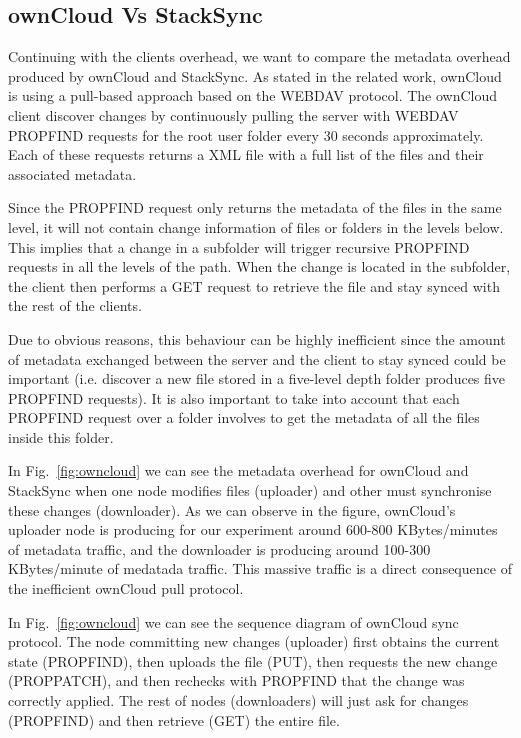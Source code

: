 \subsection{ownCloud Vs StackSync}

Continuing with the clients overhead, we want to compare the metadata overhead produced by ownCloud and StackSync. As stated in the related work, ownCloud is using a pull-based approach based on the WEBDAV protocol. The ownCloud client discover changes by continuously pulling the server with WEBDAV PROPFIND requests for the root user folder every 30 seconds approximately. Each of these requests returns a XML file with a full list of the files and their associated metadata.


Since the PROPFIND request only returns the metadata of the files in the same level, it will not contain change information of files or folders in the levels below. This implies that a change in a subfolder will trigger recursive PROPFIND requests in all the levels of the path. When the change is located in the subfolder, the client then performs a GET request to retrieve the file and stay synced with the rest of the clients.

Due to obvious reasons, this behaviour can be highly inefficient since the amount of metadata exchanged between the server and the client to stay synced could be important (i.e. discover a new file stored in a five-level depth folder produces five PROPFIND requests). It is also important to take into account that each PROPFIND request over a folder involves to get the metadata of all the files inside this folder.

In Fig.~\ref{fig:owncloud} we can see the metadata overhead for ownCloud and StackSync when one node modifies files (uploader) and other must synchronise these changes (downloader). As we can observe in the figure, ownCloud's uploader node is producing for our experiment around 600-800 KBytes/minutes of metadata traffic, and the downloader is producing around 100-300 KBytes/minute of medatada traffic.  This massive traffic is a direct consequence of the inefficient ownCloud pull protocol.

In Fig.~\ref{fig:owncloud} we can see the sequence diagram of ownCloud sync protocol. The node committing new changes (uploader) first obtains the current state (PROPFIND), then uploads the file (PUT), then requests the new change (PROPPATCH), and then rechecks with PROPFIND that the change was correctly applied. The rest of nodes (downloaders) will just ask for changes (PROPFIND) and then retrieve (GET) the entire file. 


